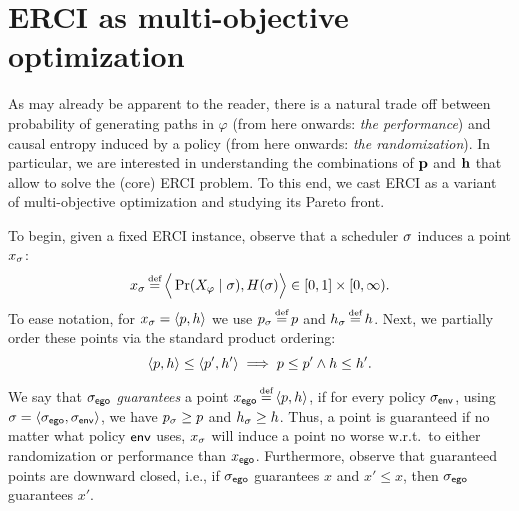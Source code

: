 \section{ERCI as multi-objective optimization}\label{sec:convex}
As may already be apparent to the reader, there is a natural trade off
between probability of generating paths in $\varphi$ (from here
onwards: \emph{the performance}) and causal entropy induced by a
policy (from here onwards: \emph{the randomization}).  In particular,
we are interested in understanding the combinations of $\mathbf{p}$
and $\mathbf{h}$ that allow to solve the (core) ERCI problem. To this
end, we cast ERCI as a variant of multi-objective optimization and
studying its Pareto front.

To begin, given a fixed ERCI instance, observe that a scheduler $\sigma$
induces a point $x_\sigma$:
\begin{equation}
  x_\sched \eqdef \Big\langle \Pr(X_\varphi \mid \sched), H(\sched) \Big\rangle \in [0,1] \times [0,\infty).  
\end{equation}
To ease notation, for $x_\sigma = \langle p,h \rangle$ we use
$\scp_\sched \eqdef \scp$ and $\rndp_\sched \eqdef \rndp$. Next, we
partially order these points via the standard product ordering:
\begin{equation}
  \langle p,h \rangle \leq \langle p',h' \rangle \implies p \leq p' \wedge h \leq h'.
\end{equation}

We say that ${\sigma_{\mathsf{ego}}}$ \emph{guarantees} a point $x_\pOne \eqdef
\langle \scp, \rndp \rangle$, if for every policy ${\sigma_{\mathsf{env}}}$, using
$\sigma = \langle {\sigma_{\mathsf{ego}}}, {\sigma_{\mathsf{env}}} \rangle$, we have
$p_\sigma \geq p$ and $h_\sigma \geq h$. Thus, a point
is guaranteed if no matter what policy $\mathsf{env}$ uses, $x_\sigma$ will
induce a point no worse w.r.t.\ to either randomization or performance
than $x_{\mathsf{ego}}$. Furthermore, observe that guaranteed points are
downward closed, i.e., if ${\sigma_{\mathsf{ego}}}$ guarantees $x$ and $x' \leq x$,
then ${\sigma_{\mathsf{ego}}}$ guarantees $x'$.

